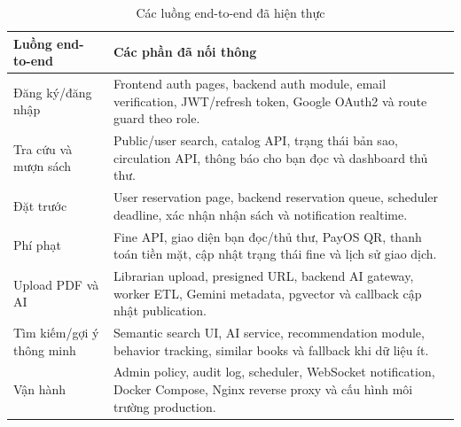 \begin{table}[H]
\centering
\small
\begin{tabularx}{\textwidth}{|p{3.7cm}|X|}
\hline
\textbf{Luồng end-to-end} & \textbf{Các phần đã nối thông} \\
\hline
Đăng ký/đăng nhập &
Frontend auth pages, backend auth module, email verification, JWT/refresh token,
Google OAuth2 và route guard theo role. \\
\hline
Tra cứu và mượn sách &
Public/user search, catalog API, trạng thái bản sao, circulation API, thông báo
cho bạn đọc và dashboard thủ thư. \\
\hline
Đặt trước &
User reservation page, backend reservation queue, scheduler deadline, xác nhận
nhận sách và notification realtime. \\
\hline
Phí phạt &
Fine API, giao diện bạn đọc/thủ thư, PayOS QR, thanh toán tiền mặt, cập nhật
trạng thái fine và lịch sử giao dịch. \\
\hline
Upload PDF và AI &
Librarian upload, presigned URL, backend AI gateway, worker ETL, Gemini metadata,
pgvector và callback cập nhật publication. \\
\hline
Tìm kiếm/gợi ý thông minh &
Semantic search UI, AI service, recommendation module, behavior tracking, similar
books và fallback khi dữ liệu ít. \\
\hline
Vận hành &
Admin policy, audit log, scheduler, WebSocket notification, Docker Compose,
Nginx reverse proxy và cấu hình môi trường production. \\
\hline
\end{tabularx}
\caption{Các luồng end-to-end đã hiện thực}
\label{tab:end_to_end_summary}
\end{table}

